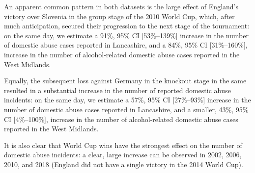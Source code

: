 \documentclass[12pt, a4paper]{article}
\begin{document}
An apparent common pattern in both datasets is the large effect of England's victory over Slovenia in the group stage of the 2010 World Cup, which, after much anticipation, secured their progression to the next stage of the tournament: on the same day, we estimate a 91\%, 95\% CI [53\%--139\%] increase in the number of domestic abuse cases reported in Lancashire, and a 84\%, 95\% CI [31\%--160\%], increase in the number of alcohol-related domestic abuse cases reported in the West Midlands.

Equally, the subsequent loss against Germany in the knockout stage in the same resulted in a substantial increase in the number of reported domestic abuse incidents: on the same day, we estimate a 57\%, 95\% CI [27\%--93\%] increase in the number of domestic abuse cases reported in Lancashire, and a smaller, 43\%, 95\% CI [4\%--100\%], increase in the number of alcohol-related domestic abuse cases reported in the West Midlands.




  It is also clear that World Cup wins have the strongest effect on the number of domestic abuse incidents: a clear, large increase can be observed in 2002, 2006, 2010, and 2018 (England did not have a single victory in the 2014 World Cup).


\end{document}

